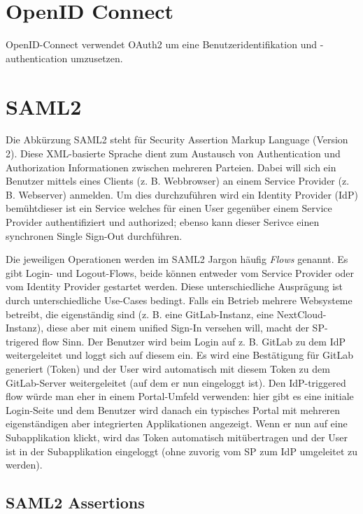 \section{OpenID Connect}

OpenID-Connect verwendet OAuth2 um eine Benutzeridentifikation und -authentication umzusetzen.

\section{SAML2}

Die Abkürzung SAML2 steht für Security Assertion Markup Language (Version 2). Diese XML-basierte Sprache dient zum Austausch von Authentication und Authorization Informationen zwischen mehreren Parteien. Dabei will sich ein Benutzer mittels eines Clients (z. B. Webbrowser) an einem Service Provider (z. B. Webserver) anmelden. Um dies durchzuführen wird ein Identity Provider (IdP) bemühtdieser ist ein Service welches für einen User gegenüber einem Service Provider authentifiziert und authorized; ebenso kann dieser Serivce einen synchronen Single Sign-Out durchführen.

Die jeweiligen Operationen werden im SAML2 Jargon häufig \textit{Flows} genannt. Es gibt Login- und Logout-Flows, beide können entweder vom Service Provider oder vom Identity Provider gestartet werden. Diese unterschiedliche Ausprägung ist durch unterschiedliche Use-Cases bedingt. Falls ein Betrieb mehrere Websysteme betreibt, die eigenständig sind (z. B. eine GitLab-Instanz, eine NextCloud-Instanz), diese aber mit einem unified Sign-In versehen will, macht der SP-trigered flow Sinn. Der Benutzer wird beim Login auf z. B. GitLab zu dem IdP weitergeleitet und loggt sich auf diesem ein. Es wird eine Bestätigung für GitLab generiert (Token) und der User wird automatisch mit diesem Token zu dem GitLab-Server weitergeleitet (auf dem er nun eingeloggt ist). Den IdP-triggered flow würde man eher in einem Portal-Umfeld verwenden: hier gibt es eine initiale Login-Seite und dem Benutzer wird danach ein typisches Portal mit mehreren eigenständigen aber integrierten Applikationen angezeigt. Wenn er nun auf eine Subapplikation klickt, wird das Token automatisch mitübertragen und der User ist in der Subapplikation eingeloggt (ohne zuvorig vom SP zum IdP umgeleitet zu werden).

\subsection{SAML2 Assertions}

